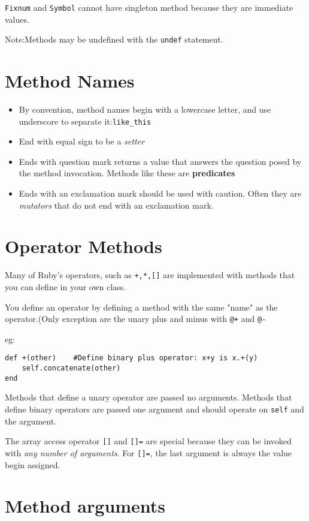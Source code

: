 \documentclass[11pt, a4paper]{book}
\begin{document}
\verb|Fixnum| and \verb|Symbol| cannot have singleton method because they are
immediate values.

Note:Methods may be undefined with the \verb|undef| statement.

\section{Method Names}
\begin{itemize}
\item By convention, method names begin with a lowercase letter, and use
underscore to separate it:\verb|like_this|
\item End with equal sign to be a \emph{setter}
\item Ends with question mark returns a value that answers the question posed by
the method invocation. Methods like these are \textbf{predicates}
\item Ends with an exclamation mark should be used with caution. Often they are
\emph{mutators} that do not end with an exclamation mark.
\end{itemize}


\section{Operator Methods}
Many of Ruby's operators, such as \verb|+,*,[]| are implemented with methods
that you can  define in your own class.

You define an operator by defining a method with the same "name" as the
operator.(Only exception are the unary plus and minus with \verb|@+| and
\verb|@-|

eg:
\begin{verbatim}
def +(other)    #Define binary plus operator: x+y is x.+(y)
    self.concatenate(other)
end
\end{verbatim}

Methods that define a unary operator are passed no arguments. Methods that
define binary operators are passed one argument and should operate on
\verb|self| and the argument.

The array access operator \verb|[]| and \verb|[]=| are special because they can
be invoked with \emph{any number of arguments}. For \verb|[]=|, the last
argument is always the value begin assigned.

\section{Method arguments}
\end{document}
